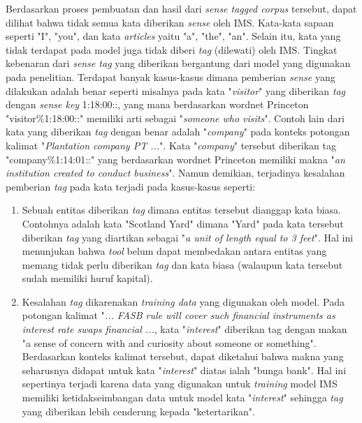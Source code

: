 Berdasarkan proses pembuatan dan hasil dari \textit{sense tagged corpus} tersebut, dapat dilihat bahwa tidak semua kata diberikan \textit{sense} oleh IMS. Kata-kata sapaan seperti "I", "you", dan kata \textit{articles} yaitu "a", "the", "an". Selain itu, kata yang tidak terdapat pada model juga tidak diberi \textit{tag} (dilewati) oleh IMS. Tingkat kebenaran dari \textit{sense tag} yang diberikan bergantung dari model yang digunakan pada penelitian. Terdapat banyak kasus-kasus dimana pemberian \textit{sense} yang dilakukan adalah benar seperti misalnya pada kata "\textit{visitor}" yang diberikan \textit{tag} dengan \textit{sense key} 1:18:00::, yang mana berdasarkan wordnet Princeton "visitor\%1:18:00::" memiliki arti sebagai "\textit{someone who visits}". Contoh lain dari kata yang diberikan \textit{tag} dengan benar adalah "\textit{company}" pada konteks potongan kalimat "\textit{Plantation company PT ...}". Kata "\textit{company}" tersebut diberikan tag "company\%1:14:01::" yang berdasarkan wordnet Princeton memiliki makna "\textit{an institution created to conduct business}". Namun demikian, terjadinya kesalahan pemberian \textit{tag} pada kata terjadi pada kasus-kasus seperti: 

\begin{enumerate}
	\item Sebuah entitas diberikan \textit{tag} dimana entitas tersebut dianggap kata biasa. Contohnya adalah kata "Scotland Yard" dimana "Yard" pada kata tersebut diberikan \textit{tag} yang diartikan sebagai "\textit{a unit of length equal to 3 feet}". Hal ini menunjukan bahwa \textit{tool} belum dapat membedakan antara entitas yang memang tidak perlu diberikan \textit{tag} dan kata biasa (walaupun kata tersebut sudah memiliki huruf kapital).
	\item Kesalahan \textit{tag} dikarenakan \textit{training data} yang digunakan oleh model. Pada potongan kalimat "\textit{... FASB rule will cover such financial instruments as interest rate swaps financial ...}, kata "\textit{interest}" diberikan tag dengan makan "a sense of concern with and curiosity about someone or something". Berdasarkan konteks kalimat tersebut, dapat diketahui bahwa makna yang seharusnya didapat untuk kata "\textit{interest}" diatas ialah "bunga bank". Hal ini sepertinya terjadi karena data yang digunakan untuk \textit{training} model IMS memiliki ketidakseimbangan data untuk model kata "\textit{interest}" sehingga \textit{tag} yang diberikan lebih cenderung kepada "ketertarikan".
\end{enumerate}

